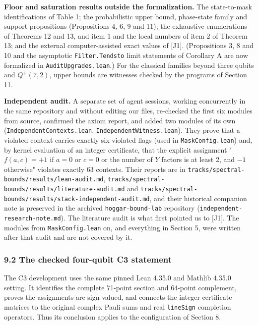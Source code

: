 \documentclass[11pt,a4paper]{article}
\begin{document}
\textbf{Floor and saturation results outside the formalization.} The state-to-mask identifications of Table 1;
the probabilistic upper bound, phase-state family and support propositions (Propositions 4, 6, 9 and 11);
the exhaustive enumerations of Theorems 12 and 13, and item 1 and the local numbers of item 2 of Theorem 13;
and the external computer-assisted exact values of {[}J1{]}. (Propositions 3, 8 and 10 and the asymptotic
\texttt{Filter.Tendsto} limit statements of Corollary A are now formalized in \nolinkurl{AuditUpgrades.lean}.) For the
classical families beyond three qubits and \(Q^+(7,2)\), upper bounds are witnesses checked by the programs of
Section 11.

\textbf{Independent audit.} A separate set of agent sessions, working concurrently in the same repository
and without editing our files, re-checked the first six modules from source, confirmed the axiom
report, and added two modules of its own (\nolinkurl{IndependentContexts.lean}, \nolinkurl{IndependentWitness.lean}). They
prove that a violated context carries exactly six violated flags (used in \texttt{MaskConfig.lean}) and, by
kernel evaluation of an integer certificate, that the explicit assignment
"\(f(a,c) = +1\) if \(a = 0\) or \(c = 0\) or the number of \(Y\) factors is at least 2, and \(-1\) otherwise"
violates exactly 63 contexts. Their reports are in \nolinkurl{tracks/spectral-bounds/results/lean-audit.md},
\nolinkurl{tracks/spectral-bounds/results/literature-audit.md} and \nolinkurl{tracks/spectral-bounds/results/stack-independent-audit.md}, and their historical companion note is preserved in the archived \texttt{hoggar-bound-lab} repository (\texttt{independent-research-note.md}). The literature audit is what first pointed us to {[}J1{]}. The
modules from \texttt{MaskConfig.lean} on, and everything in Section 5, were written after that audit and are
not covered by it.

\subsubsection{9.2 The checked four-qubit C3 statement}\label{92-the-checked-four-qubit-c3-statement}

The C3 development uses the same pinned Lean 4.35.0 and Mathlib 4.35.0 setting. It identifies the
complete 71-point section and 64-point complement, proves the assignments are sign-valued, and
connects the integer certificate matrices to the original complex Pauli sums and real \texttt{lineSign}
completion operators. Thus its conclusion applies to the configuration of Section 8.
\end{document}
